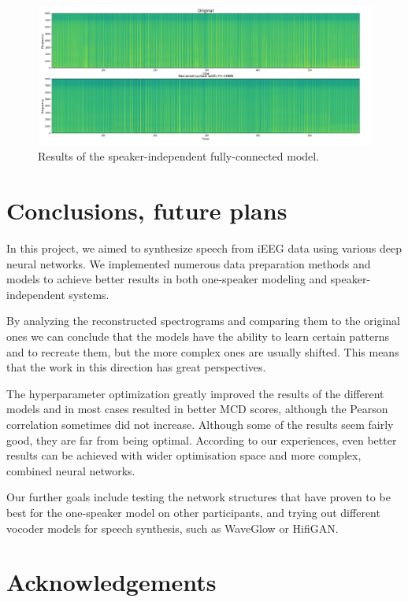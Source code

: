 \documentclass{article}
\begin{document}
\begin{figure}
    \centering
    \includegraphics[width=\textwidth]{speak_indep.png}
    \caption{Results of the speaker-independent fully-connected model.}
    \label{fig:indep}
\end{figure}


\section{Conclusions, future plans}
In this project, we aimed to synthesize speech from iEEG data using various deep neural networks. We implemented numerous data preparation methods and models to achieve better results in both one-speaker modeling and speaker-independent systems.

By analyzing the reconstructed spectrograms and comparing them to the original ones we can conclude that the models have the ability to learn certain patterns and to recreate them, but the more complex ones are usually shifted. This means that the work in this direction has great perspectives.

The hyperparameter optimization greatly improved the results of the different models and in most cases resulted in better MCD scores, although the Pearson correlation sometimes did not increase.
Although some of the results seem fairly good, they are far from being optimal. According to our experiences, even better results can be achieved with wider optimisation space and more complex, combined neural networks.

Our further goals include testing the network structures that have proven to be best for the one-speaker model on other participants, and trying out different vocoder models for speech synthesis, such as WaveGlow\cite{waveglow} or HifiGAN\cite{hifigan}. 

\section{Acknowledgements}
\end{document}
